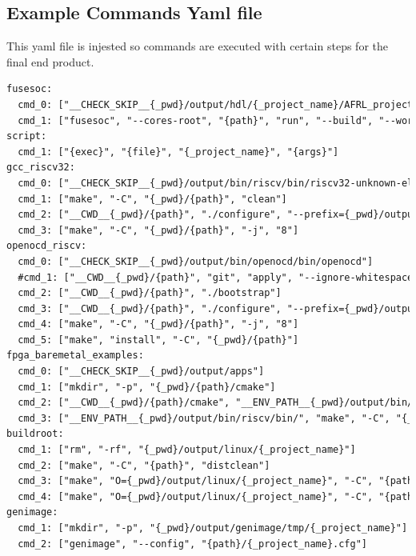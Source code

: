 \subsection{Example Commands Yaml file}
This yaml file is injested so commands are executed with certain steps for the final end product.
\begin{lstlisting}[language=XML]
fusesoc:
  cmd_0: ["__CHECK_SKIP__{_pwd}/output/hdl/{_project_name}/AFRL_project_veronica_axi_baremetal_1.0.0.bit"]
  cmd_1: ["fusesoc", "--cores-root", "{path}", "run", "--build", "--work-root", "output/hdl/{_project_name}", "--target", "{target}", "{project}"]
script:
  cmd_1: ["{exec}", "{file}", "{_project_name}", "{args}"]
gcc_riscv32:
  cmd_0: ["__CHECK_SKIP__{_pwd}/output/bin/riscv/bin/riscv32-unknown-elf-gcc"]
  cmd_1: ["make", "-C", "{_pwd}/{path}", "clean"]
  cmd_2: ["__CWD__{_pwd}/{path}", "./configure", "--prefix={_pwd}/output/bin/riscv", "--disable-linux", "--with-arch=rv32imac", "--with-abi-ilp32"]
  cmd_3: ["make", "-C", "{_pwd}/{path}", "-j", "8"]
openocd_riscv:
  cmd_0: ["__CHECK_SKIP__{_pwd}/output/bin/openocd/bin/openocd"]
  #cmd_1: ["__CWD__{_pwd}/{path}", "git", "apply", "--ignore-whitespace", "../patch/pmpregs.patch"]
  cmd_2: ["__CWD__{_pwd}/{path}", "./bootstrap"]
  cmd_3: ["__CWD__{_pwd}/{path}", "./configure", "--prefix={_pwd}/output/bin/openocd", "--enable-ftdi", "--enable-dummy", "--enable-jtag_vpi"]
  cmd_4: ["make", "-C", "{_pwd}/{path}", "-j", "8"]
  cmd_5: ["make", "install", "-C", "{_pwd}/{path}"]
fpga_baremetal_examples:
  cmd_0: ["__CHECK_SKIP__{_pwd}/output/apps"]
  cmd_1: ["mkdir", "-p", "{_pwd}/{path}/cmake"]
  cmd_2: ["__CWD__{_pwd}/{path}/cmake", "__ENV_PATH__{_pwd}/output/bin/riscv/bin/", "cmake", "../", "-DCMAKE_RUNTIME_OUTPUT_DIRECTORY={_pwd}/output/apps", "-DCMAKE_PREFIX_PATH={_pwd}/output/bin/riscv/bin/", "-DBUILD_EXAMPLES_ALL=ON", "-DCMAKE_TOOLCHAIN_FILE={_pwd}/{path}/arch/riscv/riscv.cmake"]
  cmd_3: ["__ENV_PATH__{_pwd}/output/bin/riscv/bin/", "make", "-C", "{_pwd}/{path}/cmake"]
buildroot:
  cmd_1: ["rm", "-rf", "{_pwd}/output/linux/{_project_name}"]
  cmd_2: ["make", "-C", "{path}", "distclean"]
  cmd_3: ["make", "O={_pwd}/output/linux/{_project_name}", "-C", "{path}", "{config}"]
  cmd_4: ["make", "O={_pwd}/output/linux/{_project_name}", "-C", "{path}"]
genimage:
  cmd_1: ["mkdir", "-p", "{_pwd}/output/genimage/tmp/{_project_name}"]
  cmd_2: ["genimage", "--config", "{path}/{_project_name}.cfg"]
\end{lstlisting}

